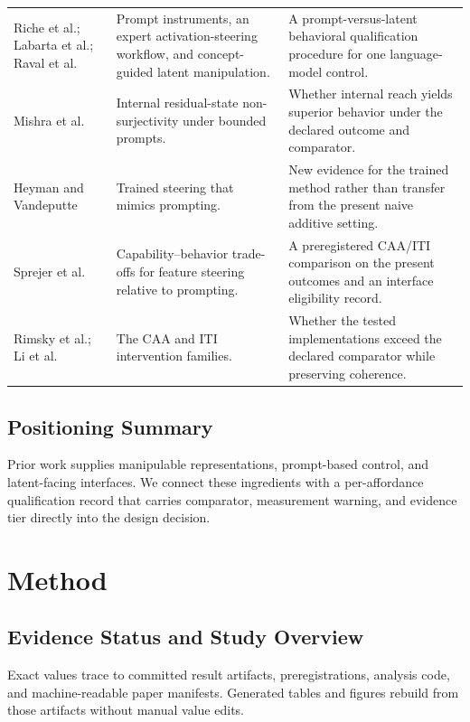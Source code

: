 \documentclass[manuscript,review,anonymous]{acmart}
\begin{document}
\begin{table}[t]
\begin{tabular}{@{}p{}p{}p{}@{}}
Riche et al.; Labarta et al.; Raval et al. \cite{riche2025aiinstr,labarta2026attribution,raval2026latman} & Prompt instruments, an expert activation-steering workflow, and concept-guided latent manipulation. & A prompt-versus-latent behavioral qualification procedure for one language-model control. \\
Mishra et al. \cite{mishra2026nonsurj} & Internal residual-state non-surjectivity under bounded prompts. & Whether internal reach yields superior behavior under the declared outcome and comparator. \\
Heyman and Vandeputte \cite{heyman2026steer} & Trained steering that mimics prompting. & New evidence for the trained method rather than transfer from the present naive additive setting. \\
Sprejer et al. \cite{sprejer2026mindgap} & Capability–behavior trade-offs for feature steering relative to prompting. & A preregistered CAA/ITI comparison on the present outcomes and an interface eligibility record. \\
Rimsky et al.; Li et al. \cite{rimsky2024caa,li2023iti} & The CAA and ITI intervention families. & Whether the tested implementations exceed the declared comparator while preserving coherence. \\
\bottomrule
\end{tabular}
\end{table}

\subsection{Positioning Summary}\label{positioning-summary}

Prior work supplies manipulable representations, prompt-based control, and latent-facing interfaces. We connect these ingredients with a per-affordance qualification record that carries comparator, measurement warning, and evidence tier directly into the design decision. {}%

\section{Method}\label{method}

\subsection{Evidence Status and Study Overview}\label{evidence-status-and-study-overview}

Exact values trace to committed result artifacts, preregistrations, analysis code, and machine-readable paper manifests. Generated tables and figures rebuild from those artifacts without manual value edits. {}%
\end{document}
